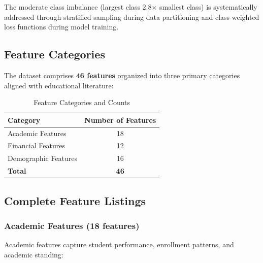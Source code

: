The moderate class imbalance (largest class 2.8$\times$ smallest class) is systematically addressed through stratified sampling during data partitioning and class-weighted loss functions during model training.

\subsection{Feature Categories}

The dataset comprises \textbf{46 features} organized into three primary categories aligned with educational literature:

\begin{table}[h]
\centering
\caption{Feature Categories and Counts}
\label{tab:feature_categories}
\begin{tabular}{lc}
\toprule
\textbf{Category} & \textbf{Number of Features} \\
\midrule
Academic Features & 18 \\
Financial Features & 12 \\
Demographic Features & 16 \\
\midrule
\textbf{Total} & \textbf{46} \\
\bottomrule
\end{tabular}
\end{table}

\subsection{Complete Feature Listings}

\subsubsection{Academic Features (18 features)}

Academic features capture student performance, enrollment patterns, and academic standing:

